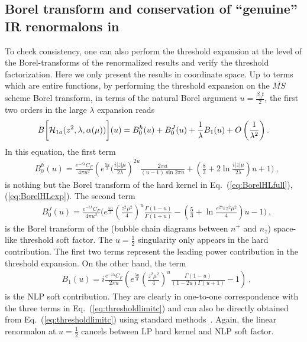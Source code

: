 \documentclass[a4paper,11pt]{article}
\begin{document}
\subsection{Borel transform and conservation of ``genuine'' IR renormalons in~\cite{Braun:2018brg} }
To check consistency, one can also perform the threshold expansion at the level of the Borel-transforms of the renormalized results and verify the threshold factorization. Here we only present the results in coordinate space. Up to terms which are entire functions, by performing the threshold expansion on the $\overline {MS}$ scheme Borel transform,  in terms of the natural Borel argument $u=\frac{\beta_0t}{2}$, the first two orders in the large $\lambda$ expansion reads
\begin{align}
B\bigg[{\cal H}_{1a}(z^2,\lambda,\alpha(\mu))\bigg](u) = B^h_{0}(u) +B_0^J(u)+ \frac{1}{\lambda}B_{1}(u)  + O\left( \frac{1}{\lambda^2} \right).
\end{align}
In this equation, the first term
\begin{align}
&B_{0}^h(u) = \frac{e^{-i \lambda } C_F}{4 \pi u^2 } \left( e^{\frac{5u}{3}} \bigg(\frac{ i |z|\mu }{2\lambda}\right)^{2u} \frac{2\pi u}{(u-1)\sin 2\pi u} + \left(\frac{8}{3}+2\ln \frac{ i |z|\mu }{2\lambda}\right)u+1\bigg) \ ,
\end{align}
is nothing but the Borel transform of the hard kernel in Eq.~(\ref{eq:BorelHLfull}), (\ref{eq:BorelHLexp}).  The second term
\begin{align}\label{eq:BorelJ}
&B_0^J(u)= \frac{e^{-i \lambda } C_F}{4 \pi u^2 } \bigg( e^{\frac{5u}{3}} \left(\frac{z^2 \mu ^2}{4 }\right)^u \frac{\Gamma (1-u) }{\Gamma (1+u)}-\left(\frac{5}{3}+\ln \frac{e^{2\gamma_E}z^2\mu^2}{4}\right)u-1\bigg) \ ,
\end{align}
is the Borel transform of the (bubble chain diagrams between $n^+$ and $n_z$) space-like threshold soft factor. The $u=\frac{1}{2}$ singularity only appears in the hard contribution. The first two terms represent the leading power contribution in the threshold expansion. On the other hand, the term
\begin{align}
&B_{1}(u) = i\frac{e^{-i \lambda } C_F}{2\pi  u} \left( e^{\frac{5u}{3}} \left(\frac{z ^2 \mu ^2}{4 }\right)^u \frac{ \Gamma (1-u)}{(1-2 u) \Gamma (u+1)} -1\right) \ ,
\end{align}
is the NLP soft contribution. They are clearly in one-to-one correspondence with the three terms in Eq.~(\ref{eq:thresholdlimitc}) and can also be directly obtained from Eq.~(\ref{eq:thresholdlimitc}) using standard methods~\cite{Palanques-Mestre:1983ogz,Beneke:1994sw,Beneke:1995pq,Scimemi:2016ffw}. Again, the linear renormalon at $u=\frac{1}{2}$ cancels between LP hard kernel and NLP soft factor. 
\end{document}
